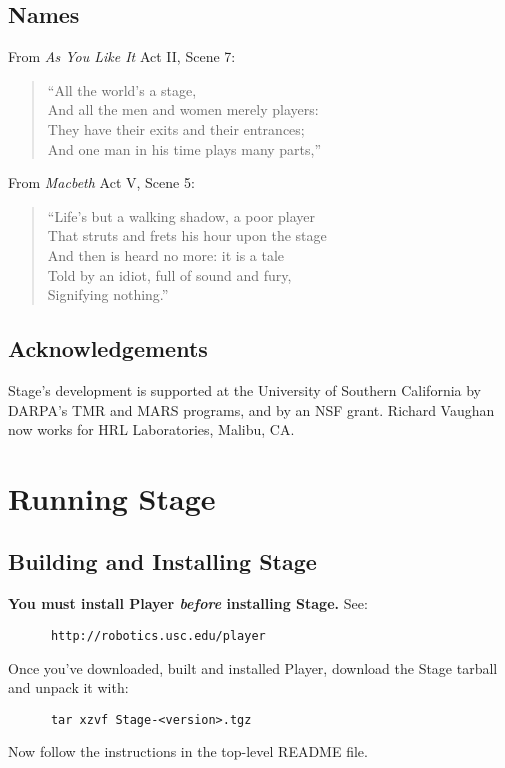 \documentclass[11pt]{report}
\begin{document}
  \section{Names}
    
    From {\sl As You Like It} Act II, Scene 7:
    \begin{quote}
    ``All the world's a stage, \\
    And all the men and women merely players: \\
    They have their exits and their entrances; \\
    And one man in his time plays many parts,''\\
    \end{quote}

    From {\sl Macbeth} Act V, Scene 5:
    \begin{quote}
    ``Life's but a walking shadow, a poor player \\
    That struts and frets his hour upon the stage \\
    And then is heard no more: it is a tale \\
    Told by an idiot, full of sound and fury, \\
    Signifying nothing.''\\
    \end{quote}

  \section{Acknowledgements}

    Stage's development is supported at the University of Southern
    California by DARPA's TMR and MARS programs, and by an NSF grant.
    Richard Vaughan now works for HRL Laboratories, Malibu, CA.


\chapter{Running Stage}

  \section{Building and Installing Stage}

    {\bf You must install Player {\sl before} installing Stage.} 
    See:
      \begin{verbatim}
      http://robotics.usc.edu/player
      \end{verbatim}
    Once you've downloaded, built and installed Player, download
    the Stage tarball and unpack it with:
      \begin{verbatim}
      tar xzvf Stage-<version>.tgz
      \end{verbatim}
    Now follow the instructions in the top-level README file.
\end{document}
